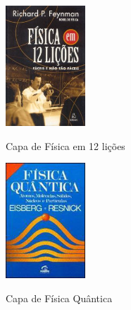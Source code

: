 \documentclass[
	12pt,				%
	openright,			%
	oneside,			%
	a4paper,			%
	english,			%
	french,				%
	spanish,			%
	brazil				%
	]{abntex2}
\begin{document}
\begin{figure}[!htb]
	\caption{Capa de Física em 12 lições}
	\centering
	\includegraphics[width=3cm]{feynman.jpg}
	\label{fig:feynman}
\end{figure}
\begin{figure}[!htb]
	\caption{Capa de Física Quântica}
	\centering
	\includegraphics[width=3cm]{eisberg.jpg}
	\label{fig:eisberg}
\end{figure}








\printindex
\end{document}
